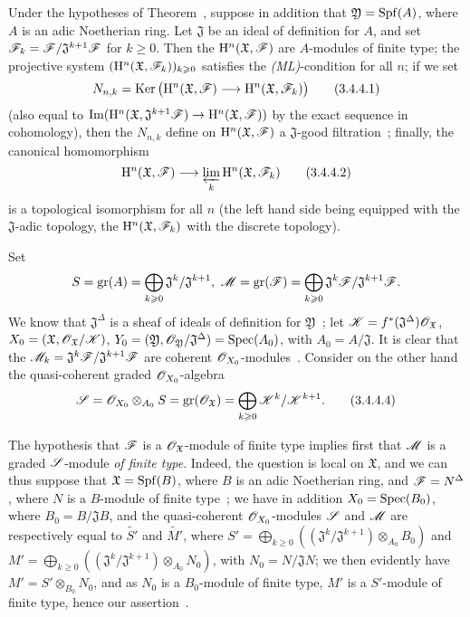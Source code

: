 \begin{corollary}[3.4.4]
\label{III.3.4.4}
Under the hypotheses of Theorem~, suppose in addition that $\mathfrak{Y}=\operatorname{Spf}(A)$, where $A$ is an adic Noetherian ring.
Let $\mathfrak{J}$ be an ideal of definition for $A$, and set $\mathscr{F}_k=\mathscr{F}/\mathfrak{J}^{k+1}\mathscr{F}$ for $k\geq 0$.
Then the $\mathrm{H}^n(\mathfrak{X},\mathscr{F})$ are $A$-modules of finite type; the projective system $(\mathrm{H}^n(\mathfrak{X},\mathscr{F}_k))_{k\geqslant 0}$ satisfies the \emph{(ML)}-condition for all $n$; if we set
\[
\label{III.3.4.4.1}
  N_{n,k}=\Ker\big(\HH^n(\mathfrak{X},\sh{F})\to\HH^n(\mathfrak{X},\sh{F}_k)\big)
  \tag{3.4.4.1}
\]
(also equal to $\Im(\HH^n(\mathfrak{X},\mathfrak{J}^{k+1}\sh{F})\to\HH^n(\mathfrak{X},\sh{F}))$ by the exact sequence in cohomology), then the $N_{n,k}$ define on $\mathrm{H}^n(\mathfrak{X},\mathscr{F})$ a $\mathfrak{J}$-good filtration~; finally, the canonical homomorphism
\[
\label{III.3.4.4.2}
  \HH^n(\mathfrak{X},\sh{F})\to\varprojlim_k\HH^n(\mathfrak{X},\sh{F}_k)
  \tag{3.4.4.2}
\]
is a topological isomorphism for all $n$ (the left hand side being equipped with the $\mathfrak{J}$-adic topology, the $\mathrm{H}^n(\mathfrak{X},\mathscr{F}_k)$ with the discrete topology).
\end{corollary}

Set
\[
\label{III.3.4.4.3}
  S=\gr(A)=\bigoplus_{k\geq 0}\mathfrak{J}^k/\mathfrak{J}^{k+1},\ \sh{M}=\gr(\sh{F})=\bigoplus_{k\geq 0}\mathfrak{J}^k\sh{F}/\mathfrak{J}^{k+1}\sh{F}.
\]
We know that $\mathfrak{J}^\Delta$ is a sheaf of ideals of definition for $\mathfrak{Y}$~; let $\mathscr{K}=f^*(\mathfrak{J}^\Delta)\mathscr{O}_\mathfrak{X}$, $X_0=(\mathfrak{X},\mathscr{O}_\mathfrak{X}/\mathscr{K})$, $Y_0=(\mathfrak{Y},\mathscr{O}_\mathfrak{Y}/\mathfrak{J}^\Delta)=\operatorname{Spec}(A_0)$, with $A_0=A/\mathfrak{J}$.
It is clear that the $\mathscr{M}_k=\mathfrak{J}^k\mathscr{F}/\mathfrak{J}^{k+1}\mathscr{F}$ are coherent $\mathscr{O}_{X_0}$-modules~.
Consider on the other hand the quasi-coherent graded $\mathscr{O}_{X_0}$-algebra
\[
\label{III.3.4.4.4}
  \mathscr{S}=\mathscr{O}_{X_0}\otimes_{A_0}S=\operatorname{gr}(\mathscr{O}_\mathfrak{X})=\bigoplus_{k\geqslant 0}\mathscr{K}^k/\mathscr{K}^{k+1}.
  \tag{3.4.4.4}
\]

The hypothesis that $\mathscr{F}$ is a $\mathscr{O}_\mathfrak{X}$-module of finite type implies first that $\mathscr{M}$ is
a graded $\mathscr{S}$-module \emph{of finite type}.
Indeed, the question is local on $\mathfrak{X}$, and we can thus suppose that $\mathfrak{X}=\operatorname{Spf}(B)$, where $B$ is an adic Noetherian ring, and $\mathscr{F}=N^\Delta$, where $N$ is a $B$-module of finite type~; we have in addition $X_0=\operatorname{Spec}(B_0)$, where $B_0=B/\mathfrak{J}B$, and the quasi-coherent $\mathscr{O}_{X_0}$-modules $\mathscr{S}$ and $\mathscr{M}$ are respectively equal to $\widetilde{S'}$ and $\widetilde{M'}$, where $S'=\bigoplus_{k\geq 0}((\mathfrak{J}^k/\mathfrak{J}^{k+1})\otimes_{A_0}B_0)$ and $M'=\bigoplus_{k\geq 0}((\mathfrak{J}^k/\mathfrak{J}^{k+1})\otimes_{A_0}N_0)$, with $N_0=N/\mathfrak{J}N$; we then evidently have $M'=S'\otimes_{B_0}N_0$, and as $N_0$ is a $B_0$-module of finite type, $M'$ is a $S'$-module of finite type, hence our assertion~.


